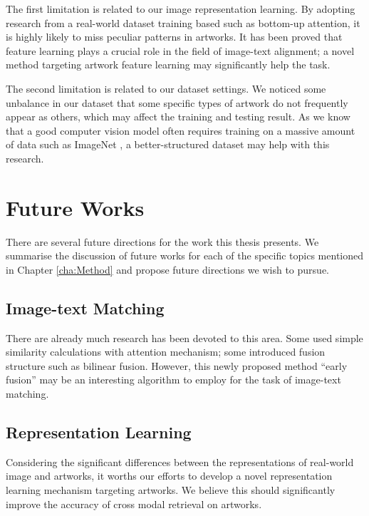 The first limitation is related to our image representation learning. By adopting research from a real-world dataset training based such as bottom-up attention, it is highly likely to miss peculiar patterns in artworks. It has been proved that feature learning plays a crucial role in the field of image-text alignment; a novel method targeting artwork feature learning may significantly help the task.

The second limitation is related to our dataset settings. We noticed some unbalance in our dataset that some specific types of artwork do not frequently appear as others, which may affect the training and testing result. As we know that a good computer vision model often requires training on a massive amount of data such as ImageNet \cite{imagenet}, a better-structured dataset may help with this research.

\section{Future Works}
There are several future directions for the work this thesis presents. We summarise the discussion of future works for each of the specific topics mentioned in Chapter \ref{cha:Method} and propose future directions we wish to pursue.

\subsection{Image-text Matching}
There are already much research has been devoted to this area. Some used simple similarity calculations with attention mechanism; some introduced fusion structure such as bilinear fusion. However, this newly proposed method ``early fusion'' may be an interesting algorithm to employ for the task of image-text matching.

\subsection{Representation Learning}
Considering the significant differences between the representations of real-world image and artworks, it worths our efforts to develop a novel representation learning mechanism targeting artworks. We believe this should significantly improve the accuracy of cross modal retrieval on artworks.




